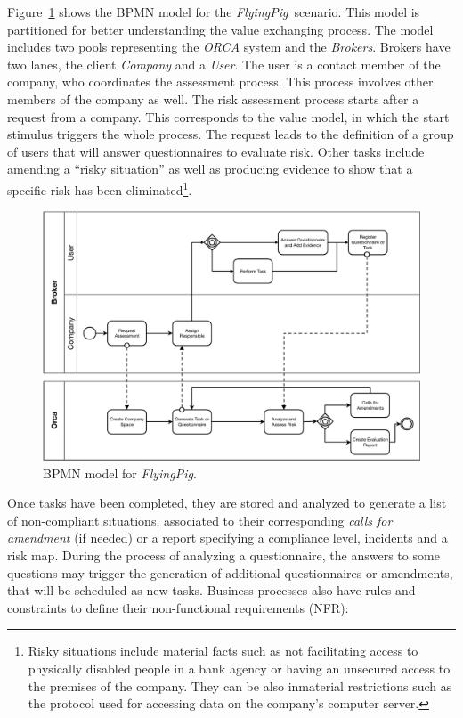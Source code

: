 \documentclass{singlecol-new}
\theoremstyle{TH}{
\newtheorem{lemma}{Lemma}
\newtheorem{theorem}[lemma]{Theorem}
\newtheorem{corrolary}[lemma]{Corrolary}
\newtheorem{conjecture}[lemma]{Conjecture}
\newtheorem{proposition}[lemma]{Proposition}
\newtheorem{claim}[lemma]{Claim}
\newtheorem{stheorem}[lemma]{Wrong Theorem}
\newtheorem{algorithm}{Algorithm}
}
\theoremstyle{THrm}{
\newtheorem{definition}{Definition}[section]
\newtheorem{question}{Question}[section]
\newtheorem{remark}{Remark}
\newtheorem{scheme}{Scheme}
}
\theoremstyle{THhit}{
\newtheorem{case}{Case}[section]
}
\theoremstyle{THhsl}{
\newtheorem{example}{Example}
}
\def\FlyingPig{\textsl{FlyingPig}\xspace}
\begin{document}
Figure~\ref{fig:BPMNmodel} shows the BPMN model
for the \FlyingPig\ scenario. This model is partitioned for better understanding the value exchanging process.
The model includes two pools representing the \textsl{ORCA} system and the \textsl{Brokers}.
Brokers have two lanes, the client \textsl{Company} and a \textsl{User}.
The user is a contact member of the company, who  coordinates the assessment process.
This process  involves other members of the company as well.
%
The risk assessment process starts after a request from a company.
This corresponds to the value model, in which the start stimulus triggers the whole process.
The request leads to the definition of a group of users that will answer questionnaires to evaluate risk.
Other tasks include amending a ``risky situation'' as well as producing evidence to show that a specific risk has been eliminated\footnote{Risky situations include  material facts such as not facilitating access to physically disabled people in a bank agency or having an unsecured access to the premises of the company.
They can be also inmaterial restrictions such as the protocol used for accessing data on the company's computer server.}.

\begin{figure}[h]
\centering
\includegraphics[width=1\textwidth]{./figures/BPMN_GCP.pdf}
\caption{BPMN model for \FlyingPig.\label{fig:BPMNmodel}}
\end{figure}

Once tasks have been completed, they are stored and analyzed to generate a list of non-compliant situations, associated to their corresponding \textit{calls for amendment} (if needed) or a report specifying a compliance level, incidents and a risk map.
During the process of analyzing a questionnaire, the answers to some questions may trigger the generation of additional questionnaires or amendments, that will be scheduled as new tasks.
Business processes also have rules and constraints to define their non-functional requirements (NFR):
\end{document}

